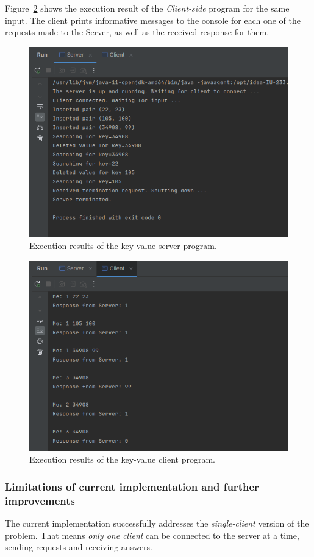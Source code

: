 \documentclass[acmlarge]{acmart}
\begin{document}
Figure~\ref{img:keyValue_client_execution} shows the execution result of the \emph{Client-side} program for the same input. The client prints informative messages to the console for each one of the requests made to the Server, as well as the received response for them.

\begin{figure}[h]
  \centering
  \includegraphics[width=0.65\linewidth]{figures/key-value-store-server-execution.png}
  \caption{Execution results of the key-value server program.}
  \label{img:keyValue_server_execution}
\end{figure}

\begin{figure}[h]
  \centering
  \includegraphics[width=0.65\linewidth]{figures/key-value-store-client-execution.png}
  \caption{Execution results of the key-value client program.}
  \label{img:keyValue_client_execution}
\end{figure}

\subsubsection{Limitations of current implementation and further improvements}
The current implementation successfully addresses the \emph{single-client} version of the problem. That means \emph{only one client} can be connected to the server at a time, sending requests and receiving answers.
\end{document}
